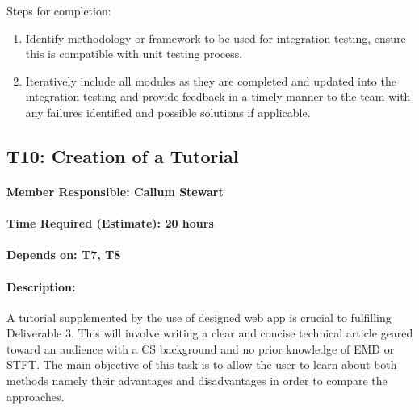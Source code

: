 \documentclass[
  english,
  paper=a4,
  oneside  ,captions=tableheading
]{scrbook}
\begin{document}
Steps for completion:
\begin{enumerate}
	\item Identify methodology or framework to be used for integration testing, ensure this is compatible with unit testing process.
	\item Iteratively include all modules as they are completed and updated into the integration testing and provide feedback in a timely manner to the team with any failures identified and possible solutions if applicable.
\end{enumerate}

\newpage
\hypertarget{t10-creation-of-a-tutorial}{%
\subsection{T10: Creation of a
Tutorial}\label{t10-creation-of-a-tutorial}}

\hypertarget{member-responsible-callum-stewart-1}{%
\paragraph{Member Responsible: Callum
Stewart}\label{member-responsible-callum-stewart-1}}

\hypertarget{time-required-estimate-20-hours-4}{%
\paragraph{Time Required (Estimate): 20
hours}\label{time-required-estimate-20-hours-4}}

\hypertarget{depends-on-t7-t8}{%
\paragraph{Depends on: T7, T8}\label{depends-on-t7-t8}}

\hypertarget{description-8}{%
\paragraph{Description:}\label{description-8}}

A tutorial supplemented by the use of designed web app is crucial to
fulfilling Deliverable 3. This will involve writing a clear and concise
technical article geared toward an audience with a CS background and no
prior knowledge of EMD or STFT. The main objective of this task is to
allow the user to learn about both methods namely their advantages and
disadvantages in order to compare the approaches.
\end{document}
